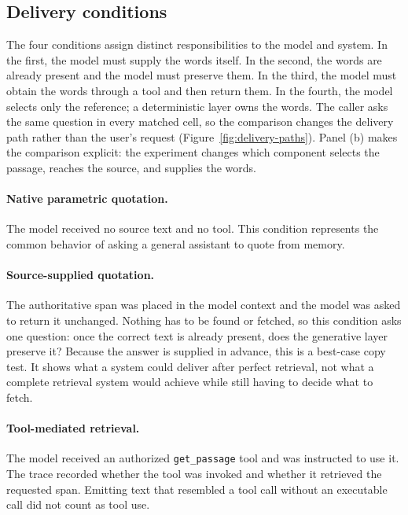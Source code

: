 \documentclass[11pt]{article}
\begin{document}
\subsection{Delivery conditions}

The four conditions assign distinct responsibilities to the model and system.
In the first, the model must supply the words itself. In the second, the words
are already present and the model must preserve them. In the third, the model
must obtain the words through a tool and then return them. In the fourth, the
model selects only the reference; a deterministic layer owns the words. The
caller asks the same question in every matched cell, so the comparison changes
the delivery path rather than the user's request
(Figure~\ref{fig:delivery-paths}).
Panel (b) makes the comparison explicit: the experiment changes which
component selects the passage, reaches the source, and supplies the words.

\paragraph{Native parametric quotation.}
The model received no source text and no tool. This condition represents the
common behavior of asking a general assistant to quote from memory.

\paragraph{Source-supplied quotation.}
The authoritative span was placed in the model context and the model was asked
to return it unchanged. Nothing has to be found or fetched, so this condition
asks one question: once the correct text is already present, does the
generative layer preserve it? Because the answer is supplied in advance, this
is a best-case copy test. It shows what a system could deliver after perfect
retrieval, not what a complete retrieval system would achieve while still
having to decide what to fetch.

\paragraph{Tool-mediated retrieval.}
The model received an authorized \texttt{get\_passage} tool and was instructed
to use it. The trace recorded whether the tool was invoked and whether it
retrieved the requested span. Emitting text that resembled a tool call without
an executable call did not count as tool use.
\end{document}
